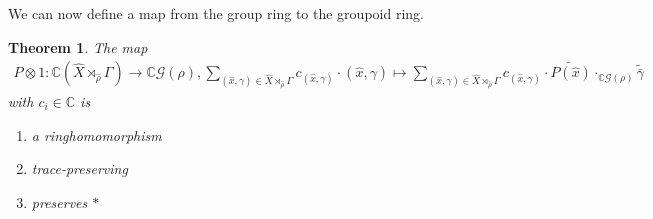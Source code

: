 \documentclass[12pt,a4paper]{scrartcl}
\theoremstyle{plain}
\newtheorem{Theorem}{Theorem}[section]
\theoremstyle{definition}
\numberwithin{equation}{section}
\newcommand{\C}{\mathbb{C}} %
\newcommand{\2}{\mathbb{Z} / 2 \mathbb{Z}}
\newcommand{\G}{\mathcal{G}}
\newcommand{\1}{\bar{1}}
\newcommand{\0}{\bar{0}}
\begin{document}
We can now define a map from the group ring to the groupoid ring. 
\begin{Theorem}\label{map_pantryagin}
	The map 
	\begin{align*}
		P \otimes 1: \C(\hat{X} \rtimes_{\hat{\rho}} \Gamma) \to \C\G(\rho), 
		\sum_{(\hat{x}, \gamma) \in \hat{X} \rtimes_{\hat{\rho}} \Gamma}
		 c_{(\hat{x}, \gamma)} \cdot (\hat{x}, \gamma) \mapsto 
		 \sum_{(\hat{x}, \gamma) \in \hat{X} \rtimes_{\hat{\rho}} \Gamma} 
		 c_{(\hat{x}, \gamma)} \cdot \widetilde{P(\hat{x})} \cdot_{\C\G(\rho)} \widetilde{\bar{\gamma}} 
	\end{align*}
	 with $c_i \in \C$ is
	\begin{enumerate}
		\item a ringhomomorphism
		\item trace-preserving
		\item preserves $*$
	\end{enumerate}
\end{Theorem}
\end{document}
